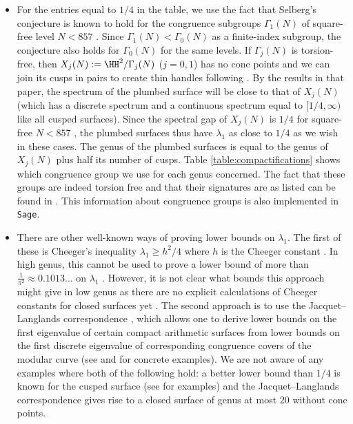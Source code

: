 \documentclass[12pt]{amsart}
\numberwithin{equation}{section}
\begin{document}
\begin{itemize}
\item For the entries equal to $1/4$ in the table, we use the fact that Selberg's conjecture is known to hold for the congruence subgroups $\Gamma_1(N)$ of square-free level $N < 857$ \cite{BookerStrombergsson}. Since $\Gamma_1(N) < \Gamma_0(N)$ as a finite-index subgroup, the conjecture also holds for $\Gamma_0(N)$ for the same levels. If $\Gamma_j(N)$ is torsion-free, then $X_j(N):=\HH^2 / \Gamma_j(N)$ ($j=0,1$) has no cone points and we can join its cusps in pairs to create thin handles following \cite{BBD}. By the results in that paper, the spectrum of the plumbed surface will be close to that of $X_j(N)$ (which has a discrete spectrum and a continuous spectrum equal to $[1/4,\infty)$ like all cusped surfaces). Since the spectral gap of $X_j(N)$ is $1/4$ for square-free $N<857$ \cite{BookerStrombergsson}, the plumbed surfaces thus have $\lambda_1$ as close to $1/4$ as we wish in these cases. The genus of the plumbed surfaces is equal to the genus of $X_j(N)$ plus half its number of cusps. Table \ref{table:compactifications} shows which congruence group we use for each genus concerned. The fact that these groups are indeed torsion free and that their signatures are as listed can be found in \cite[Section 4.2]{Miyake}. This information about congruence groups is also implemented in \texttt{Sage}.

\item There are other well-known ways of proving lower bounds on $\lambda_1$. The first of these is Cheeger's inequality $\lambda_1 \geq h^2/4$ where $h$ is the Cheeger constant \cite{Cheeger}. In high genus, this cannot be used to prove a lower bound of more than $\frac{1}{\pi^2}\approx 0.1013\ldots $ on $\lambda_1$ \cite{cheeger_constant}. However, it is not clear what bounds this approach might give in low genus as there are no explicit calculations of Cheeger constants for closed surfaces yet \cite{AdamsMorgan,Benson,BensonLakelandThen}. The second approach is to use the Jacquet--Langlands correspondence \cite{JacquetLanglands}, which allows one to derive lower bounds on the first eigenvalue of certain compact arithmetic surfaces from lower bounds on the first discrete eigenvalue of corresponding congruence covers of the modular curve (see \cite[Example 8.27]{Bergeron} and \cite{Hejhal} for concrete examples). We are not aware of any examples where both of the following hold: a better lower bound than $1/4$ is known for the cusped surface (see \cite{Huxley,BSV} for examples) and the Jacquet--Langlands correspondence gives rise to a closed surface of genus at most $20$ without cone points.
\end{itemize}
\end{document}
